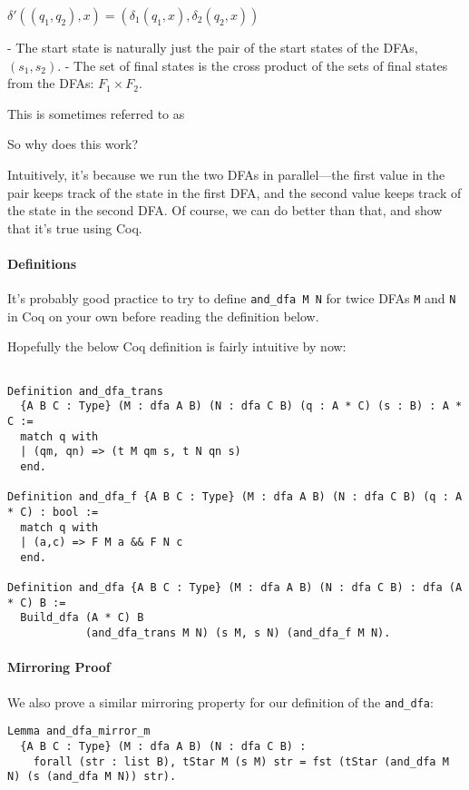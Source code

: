 $\delta'((q_1, q_2), x) = (\delta_1(q_1, x), \delta_2(q_2, x))$

- The start state is naturally just the pair of the start states of the DFAs, $(s_1, s_2)$.
- The set of final states is the cross product of the sets of final states from the DFAs: $F_1 \times F_2$.

This is sometimes referred to as

So why does this work?

Intuitively, it's because we run the two DFAs in parallel---the first value in the pair keeps track of the state in the first DFA, and the second value keeps track of the state in the second DFA.
Of course, we can do better than that, and show that it's true using Coq.

\paragraph{Definitions}

It's probably good practice to try to define \texttt{and_dfa M N} for twice DFAs \texttt{M} and \texttt{N} in Coq on your own before reading the definition below.

Hopefully the below Coq definition is fairly intuitive by now:

\begin{verbatim}

Definition and_dfa_trans
  {A B C : Type} (M : dfa A B) (N : dfa C B) (q : A * C) (s : B) : A * C :=
  match q with
  | (qm, qn) => (t M qm s, t N qn s)
  end.

Definition and_dfa_f {A B C : Type} (M : dfa A B) (N : dfa C B) (q : A * C) : bool :=
  match q with
  | (a,c) => F M a && F N c
  end.

Definition and_dfa {A B C : Type} (M : dfa A B) (N : dfa C B) : dfa (A * C) B :=
  Build_dfa (A * C) B
            (and_dfa_trans M N) (s M, s N) (and_dfa_f M N).
\end{verbatim}

\paragraph{Mirroring Proof}

We also prove a similar mirroring property for our definition of the \texttt{and_dfa}:

\begin{verbatim}
Lemma and_dfa_mirror_m
  {A B C : Type} (M : dfa A B) (N : dfa C B) :
    forall (str : list B), tStar M (s M) str = fst (tStar (and_dfa M N) (s (and_dfa M N)) str).
\end{verbatim}

